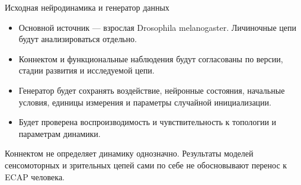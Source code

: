 \begin{frame}{Исходная нейродинамика и генератор данных}
\begin{itemize}
\item Основной источник --- взрослая Drosophila melanogaster. Личиночные цепи будут анализироваться отдельно.
\item Коннектом и функциональные наблюдения будут согласованы по версии, стадии развития и исследуемой цепи.
\item Генератор будет сохранять воздействие, нейронные состояния, начальные условия, единицы измерения и параметры случайной инициализации.
\item Будет проверена воспроизводимость и чувствительность к топологии и параметрам динамики.
\end{itemize}
\SlideGap
Коннектом не определяет динамику однозначно. Результаты моделей сенсомоторных и зрительных цепей сами по себе не обосновывают перенос к ECAP человека.
\end{frame}
